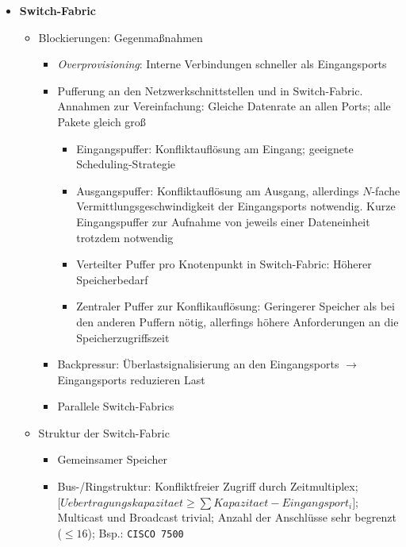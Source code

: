 \begin{itemize}
\begin{itemize}
\begin{figure}[!h]
		\end{figure}
	\end{itemize}
	\item \textbf{Switch-Fabric}
	\begin{itemize}
		\item Blockierungen: Gegenmaßnahmen
		\begin{itemize}
			\item \textit{Overprovisioning}: Interne Verbindungen schneller als Eingangsports
			\item Pufferung an den Netzwerkschnittstellen und in Switch-Fabric. Annahmen zur Vereinfachung: Gleiche Datenrate an allen Ports; alle Pakete gleich groß
			\begin{itemize}
				\item Eingangspuffer: Konfliktauflösung am Eingang; geeignete Scheduling-Strategie
				\item Ausgangspuffer: Konfliktauflösung am Ausgang, allerdings \(N\)-fache Vermittlungsgeschwindigkeit der Eingangsports notwendig. Kurze Eingangspuffer zur Aufnahme von jeweils einer Dateneinheit trotzdem notwendig
				\item Verteilter Puffer pro Knotenpunkt in Switch-Fabric: Höherer Speicherbedarf
				\item Zentraler Puffer zur Konflikauflösung: Geringerer Speicher als bei den anderen Puffern nötig, allerfings höhere Anforderungen an die Speicherzugriffszeit 
			\end{itemize}
			\item Backpressur: Überlastsignalisierung an den Eingangsports \(\rightarrow\) Eingangsports reduzieren Last
			\item Parallele Switch-Fabrics
		\end{itemize}
		\item Struktur der Switch-Fabric
		\begin{itemize}
			\item Gemeinsamer Speicher
			\item Bus-/Ringstruktur: Konfliktfreier Zugriff durch Zeitmultiplex; \(\big\lbrack Uebertragungskapazitaet \ge \sum Kapazitaet-Eingangsport_i\big\rbrack \); Multicast und Broadcast trivial; Anzahl der Anschlüsse sehr begrenzt (\(\le 16\)); Bsp.: \texttt{CISCO 7500}

\end{itemize}
\end{itemize}
\end{itemize}
